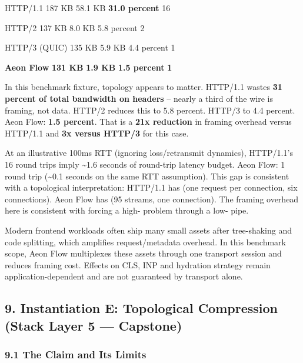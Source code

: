 \documentclass[
]{article}
\begin{document}
HTTP/1.1 \textbar{} 187 KB \textbar{} 58.1 KB \textbar{} \textbf{31.0
percent} \textbar{} 16 \textbar{}

HTTP/2 \textbar{} 137 KB \textbar{} 8.0 KB \textbar{} 5.8 percent
\textbar{} 2 \textbar{}

HTTP/3 (QUIC) \textbar{} 135 KB \textbar{} 5.9 KB \textbar{} 4.4 percent
\textbar{} 1 \textbar{}

\textbf{Aeon Flow} \textbar{} \textbf{131 KB} \textbar{} \textbf{1.9 KB}
\textbar{} \textbf{1.5 percent} \textbar{} \textbf{1} \textbar{}

In this benchmark fixture, topology appears to matter. HTTP/1.1 wastes
\textbf{31 percent of total bandwidth on headers} -- nearly a third of
the wire is framing, not data. HTTP/2 reduces this to 5.8 percent.
HTTP/3 to 4.4 percent. Aeon Flow: \textbf{1.5 percent}. That is a
\textbf{21x reduction} in framing overhead versus HTTP/1.1 and
\textbf{3x versus HTTP/3} for this case.

At an illustrative 100ms RTT (ignoring loss/retransmit dynamics),
HTTP/1.1's 16 round trips imply \textasciitilde1.6 seconds of round-trip
latency budget. Aeon Flow: 1 round trip (\textasciitilde0.1 seconds on
the same RTT assumption). This gap is consistent with a topological
interpretation: HTTP/1.1 has (one request per connection, six
connections). Aeon Flow has (95 streams, one connection). The framing
overhead here is consistent with forcing a high- problem through a low-
pipe.

Modern frontend workloads often ship many small assets after
tree-shaking and code splitting, which amplifies request/metadata
overhead. In this benchmark scope, Aeon Flow multiplexes these assets
through one transport session and reduces framing cost. Effects on CLS,
INP and hydration strategy remain application-dependent and are not
guaranteed by transport alone.

\subsection{\texorpdfstring{\textbf{9. Instantiation E: Topological
Compression (Stack Layer 5 ---
Capstone)}}{9. Instantiation E: Topological Compression (Stack Layer 5 --- Capstone)}}\label{instantiation-e-topological-compression-stack-layer-5-capstone}

\subsubsection{\texorpdfstring{\textbf{9.1 The Claim and Its
Limits}}{9.1 The Claim and Its Limits}}\label{the-claim-and-its-limits}
\end{document}
